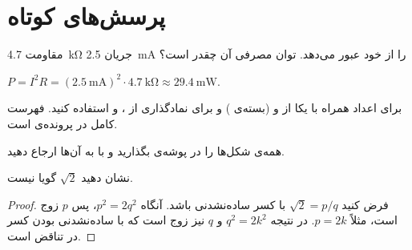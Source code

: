 \section{پرسش‌های کوتاه}

\begin{problem}[یکاها][۵]
مقاومت \qty{4.7}{\kilo\ohm} جریان \qty{2.5}{\milli\ampere} را از خود عبور می‌دهد. توان مصرفی آن چقدر است؟
\end{problem}

\begin{solution}
$P = I^2R = (\qty{2.5}{\milli\ampere})^2\cdot\qty{4.7}{\kilo\ohm} \approx \qty{29.4}{\milli\watt}$.
\end{solution}

\begin{notebox}
برای اعداد همراه با یکا از  و  (بسته‌ی ) و برای نمادگذاری از
،  و  استفاده کنید.
فهرست کامل در پرونده‌ی  است.
\end{notebox}

\begin{tipbox}[راهنما]
همه‌ی شکل‌ها را در پوشه‌ی  بگذارید و با  به آن‌ها ارجاع دهید.
\end{tipbox}

\begin{problem}[اثبات][۱۰]
نشان دهید $\sqrt{2}$ گویا نیست.
\end{problem}

\begin{proof}
فرض کنید $\sqrt2=p/q$ با کسر ساده‌نشدنی باشد. آنگاه $p^2=2q^2$، پس $p$ زوج است، مثلاً $p=2k$. در نتیجه $q^2=2k^2$ و $q$ نیز زوج است که با ساده‌نشدنی بودن کسر در تناقض است.
\end{proof}
